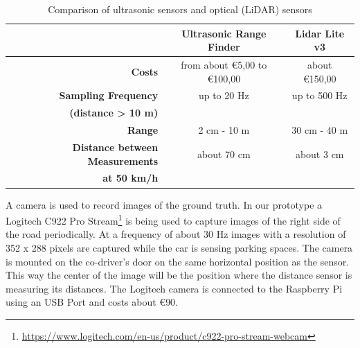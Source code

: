 \begin{table}

\bgroup
\def\arraystretch{1.5}
\begin{tabular}{| r || c | c |}
\hline
   & 
   \textbf{Ultrasonic Range Finder} & 
   \textbf{Lidar Lite v3} \\
\hline
  \textbf{Costs} & 
   from about \euro{5,00} to \euro{100,00} &
   about \euro{150,00} \\
\hline
  \textbf{Sampling Frequency} & 
   up to 20 Hz &
   up to 500 Hz \\
  \textbf{(distance > 10 m)} & & \\
\hline
  \textbf{Range} & 
   2 cm - 10 m &
   30 cm - 40 m \\
\hline
  \textbf{Distance between Measurements} & 
   about 70 cm &
   about 3 cm \\
  \textbf{at 50 km/h} & & \\
\hline

\end{tabular}
\egroup

\caption{Comparison of ultrasonic sensors and optical (LiDAR) sensors}
\label{table:comparison_us_lidar}
\end{table}

A camera is used to record images of the ground truth. In our prototype a Logitech C922 Pro Stream\footnote{\url{https://www.logitech.com/en-us/product/c922-pro-stream-webcam}} is being used to capture images of the right side of the road periodically. At a frequency of about 30 Hz images with a resolution of 352 x 288 pixels are captured while the car is sensing parking spaces. The camera is mounted on the co-driver's door on the same horizontal position as the sensor. This way the center of the image will be the position where the distance sensor is measuring its distances. The Logitech camera is connected to the Raspberry Pi using an USB Port and costs about \euro{90}.





%
%
%


